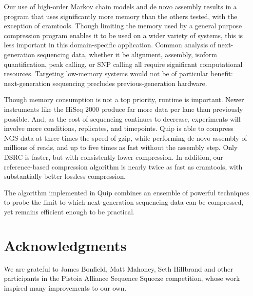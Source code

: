 \documentclass[twocolumn]{article}
\begin{document}



Our use of high-order Markov chain models and de novo assembly results in a
program that uses significantly more memory than the others tested, with the
exception of cramtools. Though limiting the memory used by a general purpose
compression program enables it to be used on a wider variety of systems, this
is less important in this domain-specific application. Common analysis of
next-generation sequencing data, whether it be alignment, assembly, isoform
quantification, peak calling, or SNP calling all require significant
computational resources. Targeting low-memory systems would not be of
particular benefit: next-generation sequencing precludes previous-generation
hardware.

Though memory consumption is not a top priority, runtime is important. Newer
instruments like the HiSeq 2000 produce far more data per lane than previously
possible. And, as the cost of sequencing continues to decrease, experiments
will involve more conditions, replicates, and timepoints.  Quip is able to
compress NGS data at three times the speed of gzip, while performing de novo
assembly of millions of reads, and up to five times as fast without the
assembly step. Only DSRC is faster, but with consistently lower compression.
In addition, our reference-based compression algorithm is nearly twice as fast
as cramtools, with substantially better lossless compression.


The algorithm implemented in Quip combines an ensemble of powerful techniques
to probe the limit to which next-generation sequencing data can be compressed,
yet remains efficient enough to be practical.

\section*{Acknowledgments}

We are grateful to James Bonfield, Matt Mahoney, Seth Hillbrand and
other participants in the Pistoia Alliance Sequence Squeeze competition, whose work inspired many improvements to our own.



\end{document}
